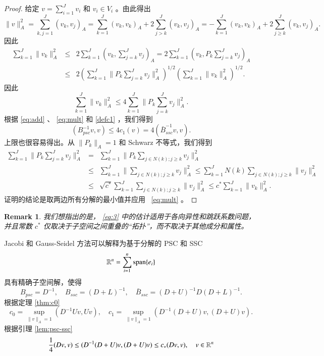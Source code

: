\documentclass[12pt]{acta_2011xz}
\newtheorem{remark}[theorem]{Remark}
\begin{document}
   \begin{proof}给定    $v=\sum_{i=1}^J v_i$    和    $v_i\in V_i$    。由此得出
   $$
\|v\|_A^2
=\sum_{k,j=1}^J(v_k,v_j)_A
=\sum_{k=1}^J(v_k,v_k)_A+2\sum_{j>k}^J(v_k,v_j)_A
=-\sum_{k=1}^J(v_k,v_k)_A+2\sum_{j\ge k}^J(v_k,v_j)_A.
$$    因此
   \begin{eqnarray*}
\sum_{k=1}^{J}\|v_k\|_A^2
&\le &
2\sum_{k=1}^{J}(v_k,\sum_{j = k}^J v_j)_A
  =    2\sum_{k=1}^{J}(v_k, P_k\sum_{j = k}^J v_j)_A \\ 
&\le&
2(\sum_{k=1}^{J}\|P_k\sum_{j = k}^J v_j\|_A^2)^{1/2}
(\sum_{k=1}^{J}\|v_k\|_A^2)^{1/2}.
  \end{eqnarray*}    因此
   $$
\sum_{k=1}^{J}\|v_k\|_A^2
\le 4\sum_{k=1}^{J}\|P_k\sum_{j = k}^J v_j\|_A^2.
$$    根据    \eqref{eq:add}    、    \eqref{eq:mult}    和    \eqref{defc1}    ，我们得到
   $$
(B_{psc}^{-1}v,v)\le 4c_1(v) =4(\bar B_{ssc}^{-1}v,v).
$$    上限也很容易得出。从    $\|P_k\|_A= 1$    和 Schwarz 不等式，我们得到
   \begin{eqnarray*}
\sum_{k=1}^{J}\|P_k\sum_{j = k}^J v_j\|_A^2
&=& 
\sum_{k=1}^{J}\|P_k\sum_{j \in N(k); j\ge k} v_j\|_A^2 \\ 
& \le & 
\sum_{k=1}^{J}\|\sum_{j \in N(k); j\ge k} v_j\|_A^2\le 
\sum_{k=1}^{J}N(k)\sum_{j \in N(k); j\ge k} \|v_j\|_A^2  \\ 
&\le& 
\sqrt{c^*} \sum_{k=1}^{J}\sum_{j \in N(k); j\ge k} \|v_j\|_A^2 
\le 
c^* \sum_{k=1}^{J}\|v_k\|_A^2. 
\end{eqnarray*}    证明的结论是取两边所有分解的最小值并应用~    \eqref{eq:mult}    。  \end{proof}     

   \begin{remark}我们想指出的是，   \eqref{eq:3}    中的估计适用于各向异性和跳跃系数问题，并且常数    $c^*$    仅取决于子空间之间重叠的“拓扑”，而不取决于其他成分和属性。  \end{remark}     

Jacobi 和 Gauss-Seidel 方法可以解释为基于分解的 PSC 和 SSC
   $$
\mathbb R^n=\sum_{i=1}^n{\rm span}  \{ e_i \}  
$$    具有精确子空间解，使得
   $$
B_{psc}=D^{-1}, \quad B_{ssc}=(D+L)^{-1}, \quad
\bar B_{ssc}=(D+U)^{-1}D (D+L)^{-1}. 
$$    根据定理    \ref{thm:c0}    
   $$
c_0=\sup_{\|v\|_A=1}(D^{-1}Uv, Uv), \quad
c_1=\sup_{\|v\|_A=1}(D^{-1}(D+U)v, (D+U)v). 
$$    根据引理    \ref{lem:psc-ssc}    
   \begin{equation}
  \label{J-GS}
{1\over 4} (Dv,v) \le (D^{-1}(D+U)v, (D+U)v)\le c_*(Dv,v),\quad v\in \mathbb R^n   
\end{equation}     
\end{document}
